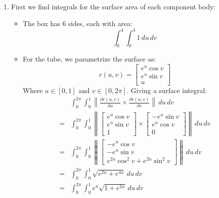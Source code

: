 \documentclass[a4paper, 11pt]{article}
\def\pp#1#2{\frac{\partial #1}{\partial #2}}
\begin{document}
\begin{enumerate}[label=(\alph*)]
	\item First we find integrals for the surface area of each component body:
	      \begin{itemize}
		      \item The box has 6 sides, each with area:
		            \[
			            \int_0^4\int_0^4 1\,du\,dv
		            \]

		      \item For the tube, we parametrize the surface as:
		            $$r(u,v)=\begin{bmatrix}
				            e^u \cos v \\
				            e^u \sin v \\
				            u
			            \end{bmatrix} $$
		            Where $u\in[0,1]$ and $v\in[0,2\pi]$. Giving a surface integral:
		            \begin{align*}
			              & \int_0^{2\pi}\int_0^1 \left\|\pp {r(u,v)}{u} \times \pp{r(u,v)}{v} \right\| \,du\,dv    \\
			            = & \int_0^{2\pi}\int_0^1 \left\|
			            \begin{bmatrix}
				            e^u\cos v \\ e^u\sin v \\ 1
			            \end{bmatrix}\times
			            \begin{bmatrix}
				            -e^u\sin v \\
				            e^u\cos v  \\
				            0
			            \end{bmatrix}
			            \right\| \,du\,dv                                                                           \\
			            = & \int_0^{2\pi}\int_0^1 \left\| \begin{bmatrix}
				                                              -e^u\cos v \\ -e^u\sin v\\  e^{2u}\cos^2v +  e^{2u}\sin^2v
			                                              \end{bmatrix} \right\| \,du \,dv \\
			            = & \int_0^{2\pi}\int_0^1 \sqrt{e^{2u}+e^{4u}} \,du \, dv                                   \\
			            = & \int_0^{2\pi}\int_0^1 e^{u}\sqrt{1+e^{2u}} \,du \, dv                                   \\
		            \end{align*}


\end{itemize}
\end{enumerate}
\end{document}
